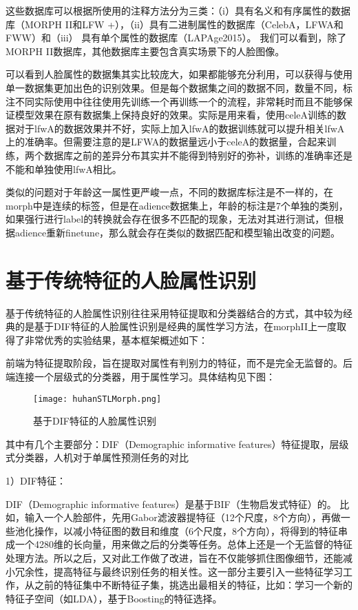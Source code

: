 这些数据库可以根据所使用的注释方法分为三类：（i）具有名义和有序属性的数据库（MORPH II和LFW +），（ii）具有二进制属性的数据库（CelebA，LFWA和FWW）和（iii） 具有单个属性的数据库（LAPAge2015）。 我们可以看到，除了MORPH II数据库，其他数据库主要包含真实场景下的人脸图像。  

可以看到人脸属性的数据集其实比较庞大，如果都能够充分利用，可以获得与使用单一数据集更加出色的识别效果。但是每个数据集之间的数据不同，数量不同，标注不同实际使用中往往使用先训练一个再训练一个的流程，非常耗时而且不能够保证模型效果在原有数据集上保持良好的效果。实际是用来看，使用celeA训练的数据对于lfwA的数据效果并不好，实际上加入lfwA的数据训练就可以提升相关lfwA上的准确率。但需要注意的是LFWA的数据量远小于celeA的数据量，合起来训练，两个数据库之前的差异分布其实并不能得到特别好的弥补，训练的准确率还是不能和单独使用lfwA相比。

类似的问题对于年龄这一属性更严峻一点，不同的数据库标注是不一样的，在morph中是连续的标签，但是在adience数据集上，年龄的标注是7个单独的类别，如果强行进行label的转换就会存在很多不匹配的现象，无法对其进行测试，但根据adience重新finetune，那么就会存在类似的数据匹配和模型输出改变的问题。

\section{基于传统特征的人脸属性识别}
基于传统特征的人脸属性识别往往采用特征提取和分类器结合的方式，其中较为经典的是基于DIF特征的人脸属性识别是经典的属性学习方法，在morphII上一度取得了非常优秀的实验结果，基本框架概述如下：

前端为特征提取阶段，旨在提取对属性有判别力的特征，而不是完全无监督的。后端连接一个层级式的分类器，用于属性学习。具体结构见下图：
\begin{figure}[!ht]
 \centering
	\texttt{[image: huhanSTLMorph.png]}
	\caption{基于DIF特征的人脸属性识别}
\end{figure}

其中有几个主要部分：DIF（Demographic informative features）特征提取，层级式分类器，人机对于单属性预测任务的对比

1）DIF特征：

DIF（Demographic informative features）是基于BIF（生物启发式特征）的。
比如，输入一个人脸部件，先用Gabor滤波器提特征（12个尺度，8个方向），再做一些池化操作，以减小特征图的数目和维度（6个尺度，8个方向），将得到的特征串成一个4280维的长向量，用来做之后的分类等任务。总体上还是一个无监督的特征处理方法。所以之后，又对此工作做了改进，旨在不仅能够抓住图像细节，还能减小冗余性，提高特征与最终识别任务的相关性。这一部分主要引入一些特征学习工作，从之前的特征集中不断特征子集，挑选出最相关的特征，比如：学习一个新的特征子空间（如LDA），基于Boosting的特征选择。

